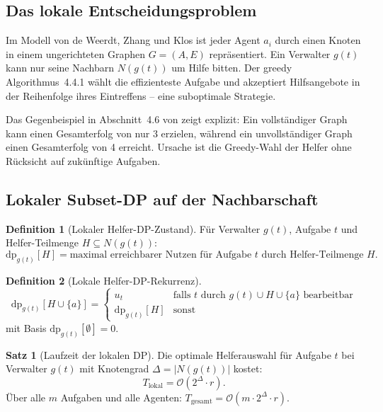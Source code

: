 \documentclass[a4paper,12pt]{article}
\theoremstyle{definition}
\newtheorem{definition}{Definition}
\newtheorem{satz}{Satz}
\begin{document}
\subsection{Das lokale Entscheidungsproblem}

Im Modell von de Weerdt, Zhang und Klos \cite{dwzk07} ist jeder Agent $a_i$
durch einen Knoten in einem ungerichteten Graphen $G = (A, E)$ repr\"{a}sentiert.
Ein Verwalter $g(t)$ kann nur seine Nachbarn $N(g(t))$ um Hilfe bitten.
Der greedy Algorithmus~4.4.1 w\"{a}hlt die effizienteste Aufgabe und akzeptiert
Hilfsangebote in der Reihenfolge ihres Eintreffens -- eine suboptimale Strategie.

Das Gegenbeispiel in Abschnitt~4.6 von \cite{sk98} zeigt explizit: Ein
vollst\"{a}ndiger Graph kann einen Gesamterfolg von nur 3 erzielen, w\"{a}hrend
ein unvollst\"{a}ndiger Graph einen Gesamterfolg von 4 erreicht. Ursache ist die
Greedy-Wahl der Helfer ohne R\"{u}cksicht auf zuk\"{u}nftige Aufgaben.

\subsection{Lokaler Subset-DP auf der Nachbarschaft}

\begin{definition}[Lokaler Helfer-DP-Zustand]
    F\"{u}r Verwalter $g(t)$, Aufgabe $t$ und Helfer-Teilmenge $H \subseteq N(g(t))$:
    \[
        \mathrm{dp}_{g(t)}[H] = \text{maximal erreichbarer Nutzen f\"{u}r Aufgabe }
        t \text{ durch Helfer-Teilmenge } H.
    \]
\end{definition}

\begin{definition}[Lokale Helfer-DP-Rekurrenz]
    \begin{equation}
        \mathrm{dp}_{g(t)}[H \cup \{a\}] =
        \begin{cases}
            u_t & \text{falls } t \text{ durch } g(t) \cup H \cup \{a\} \text{ bearbeitbar}\\
            \mathrm{dp}_{g(t)}[H] & \text{sonst}
        \end{cases}
        \label{eq:local_dp}
    \end{equation}
    mit Basis $\mathrm{dp}_{g(t)}[\emptyset] = 0$.
\end{definition}

\begin{satz}[Laufzeit der lokalen DP]
    \label{satz:local_dp}
    Die optimale Helferauswahl f\"{u}r Aufgabe $t$ bei Verwalter $g(t)$
    mit Knotengrad $\Delta = |N(g(t))|$ kostet:
    \[
        T_{\mathrm{lokal}} = \mathcal{O}(2^\Delta \cdot r).
    \]
    \"{U}ber alle $m$ Aufgaben und alle Agenten:
    $T_{\mathrm{gesamt}} = \mathcal{O}(m \cdot 2^\Delta \cdot r)$.
\end{satz}
\end{document}
